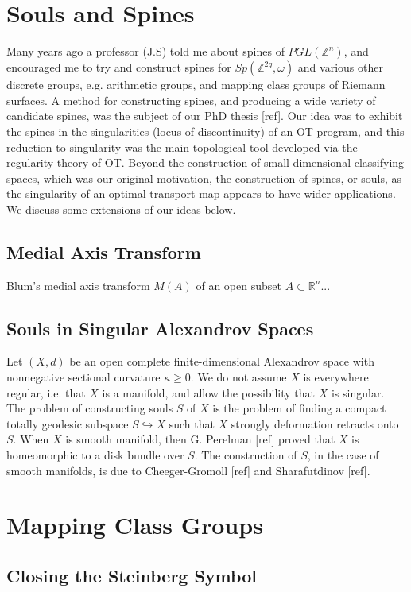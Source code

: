 \documentclass[12pt]{amsart}
\theoremstyle{definition}
\theoremstyle{remark}
\newcommand{\bR}{\mathbb{R}}
\newcommand{\bZ}{\mathbb{Z}}
\begin{document}
\section{Souls and Spines}
Many years ago a professor (J.S) told me about spines of $PGL(\mathbb{Z}^n)$, and encouraged me to try and construct spines for $Sp(\bZ^{2g}, \omega)$ and various other discrete groups, e.g. arithmetic groups, and mapping class groups of Riemann surfaces. A method for constructing spines, and producing a wide variety of candidate spines, was the subject of our PhD thesis [ref]. Our idea was to exhibit the spines in the singularities (locus of discontinuity) of an OT program, and this reduction to singularity was the main topological tool developed via the regularity theory of OT. Beyond the construction of small dimensional classifying spaces, which was our original motivation, the construction of spines, or souls, as the singularity of an optimal transport map appears to have wider applications. We discuss some extensions of our ideas below.

\subsection{Medial Axis Transform}

Blum's medial axis transform $M(A)$ of an open subset $A\subset \bR^n$...


\subsection{Souls in Singular Alexandrov Spaces}
Let $(X,d)$ be an open complete finite-dimensional Alexandrov space with nonnegative sectional curvature $\kappa \geq 0$. We do not assume $X$ is everywhere regular, i.e. that $X$ is a manifold, and allow the possibility that $X$ is singular. The problem of constructing souls $S$ of $X$ is the problem of finding a compact totally geodesic subspace $S \hookrightarrow X$ such that $X$ strongly deformation retracts onto $S$. When $X$ is smooth manifold, then G. Perelman [ref] proved that $X$ is homeomorphic to a disk bundle over $S$. The construction of $S$, in the case of smooth manifolds, is due to Cheeger-Gromoll [ref] and Sharafutdinov [ref]. 





\section{Mapping Class Groups}
\subsection{Closing the Steinberg Symbol}

\section{}




\printbibliography[title={References}]
\end{document}
